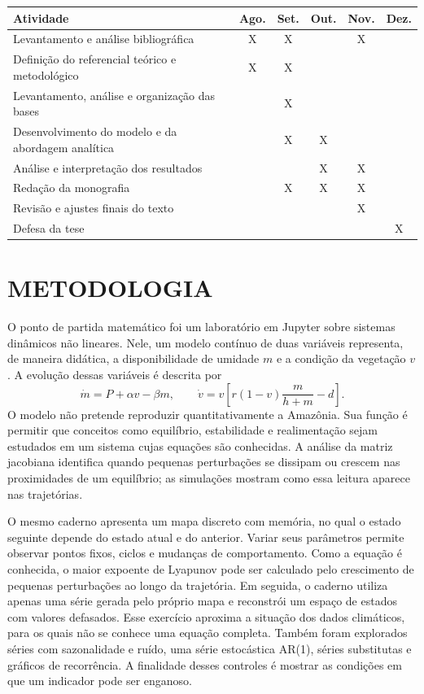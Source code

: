 \documentclass[12pt,a4paper]{article}
\newcommand{\feito}{\cellcolor{concluida}X}
\newcommand{\fazendo}{\cellcolor{andamento}X}
\newcommand{\pendente}{\cellcolor{naoiniciada}X}
\begin{document}
\small
\setlength{\tabcolsep}{4pt}
\begin{tabularx}{\textwidth}{|X|c|c|c|c|c|}\hline
Atividade & Ago. & Set. & Out. & Nov. & Dez.\\\hline
Levantamento e análise bibliográfica & \feito & \fazendo & & \pendente & \\\hline
Definição do referencial teórico e metodológico & \feito & \fazendo & & & \\\hline
Levantamento, análise e organização das bases & & \fazendo & & & \\\hline
Desenvolvimento do modelo e da abordagem analítica & & \fazendo & \pendente & & \\\hline
Análise e interpretação dos resultados & & & \pendente & \pendente & \\\hline
Redação da monografia & & \fazendo & \pendente & \pendente & \\\hline
Revisão e ajustes finais do texto & & & & \pendente & \\\hline
Defesa da tese & & & & & \pendente\\\hline
\end{tabularx}
\normalsize

\section*{METODOLOGIA}

O ponto de partida matemático foi um laboratório em Jupyter sobre sistemas dinâmicos não lineares. Nele, um modelo contínuo de duas variáveis representa, de maneira didática, a disponibilidade de umidade \(m\) e a condição da vegetação \(v\). A evolução dessas variáveis é descrita por
\[
\dot m=P+\alpha v-\beta m,
\qquad
\dot v=v\left[r(1-v)\frac{m}{h+m}-d\right].
\]
O modelo não pretende reproduzir quantitativamente a Amazônia. Sua função é permitir que conceitos como equilíbrio, estabilidade e realimentação sejam estudados em um sistema cujas equações são conhecidas. A análise da matriz jacobiana identifica quando pequenas perturbações se dissipam ou crescem nas proximidades de um equilíbrio; as simulações mostram como essa leitura aparece nas trajetórias.

O mesmo caderno apresenta um mapa discreto com memória, no qual o estado seguinte depende do estado atual e do anterior. Variar seus parâmetros permite observar pontos fixos, ciclos e mudanças de comportamento. Como a equação é conhecida, o maior expoente de Lyapunov pode ser calculado pelo crescimento de pequenas perturbações ao longo da trajetória. Em seguida, o caderno utiliza apenas uma série gerada pelo próprio mapa e reconstrói um espaço de estados com valores defasados. Esse exercício aproxima a situação dos dados climáticos, para os quais não se conhece uma equação completa. Também foram explorados séries com sazonalidade e ruído, uma série estocástica AR(1), séries substitutas e gráficos de recorrência. A finalidade desses controles é mostrar as condições em que um indicador pode ser enganoso.
\end{document}
